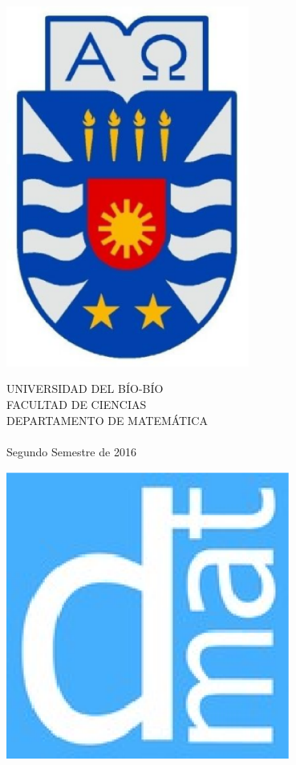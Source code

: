 \thispagestyle{empty}
\begin{minipage}{2cm}
\includegraphics[width=0.6\textwidth]{escubo-ubb.eps}
\end{minipage}
\begin{minipage}{12cm}
\small
{\bf \rm 
{
\begin{center}
{\footnotesize UNIVERSIDAD DEL B\'IO-B\'IO} \\
{\scriptsize FACULTAD DE CIENCIAS}  \\
{\scriptsize DEPARTAMENTO DE MATEM\'ATICA}  \\
{\scriptsize 
\autores
}\\
{\scriptsize Segundo Semestre de 2016}
\end{center}
}}
\end{minipage}
\begin{minipage}{2cm}
\hspace*{-0.5cm}\vspace*{-0.05cm}\includegraphics[width=0.7\textwidth]{escudo-dmat.eps}
\end{minipage}

